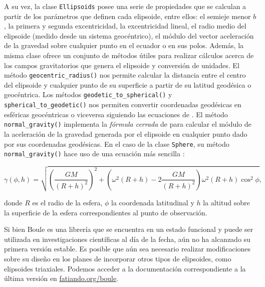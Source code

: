 

A su vez, la clase \texttt{Ellipsoids} posee una serie de propiedades que se
calculan a partir de los parámetros que definen cada elipsoide, entre ellos: el
semieje menor $b$, la primera y segunda excentricidad, la excentricidad lineal,
el radio medio del elipsoide (medido desde un sistema geocéntrico), el módulo
del vector aceleración de la gravedad sobre cualquier punto en el ecuador o en
sus polos.
Además, la misma clase ofrece un conjunto de métodos útiles para realizar
cálculos acerca de los campos gravitatorios que genera el elipsoide
y conversión de unidades.
El método \texttt{geocentric\_radius()} nos permite calcular la distancia entre
el centro del elipsoide y cualquier punto de su superficie a partir de su
latitud geodésica o geocéntrica.
Los métodos \texttt{geodetic\_to\_spherical()}
y \texttt{spherical\_to\_geodetic()} nos permiten convertir coordenadas
geodésicas en esféricas geocéntricas o viceversa siguiendo las ecuaciones de
\citet{vermeille2002}.
El método \texttt{normal\_gravity()} implementa la \emph{fórmula cerrada} de
\citet{li2001a} para calcular el módulo de la aceleración de la gravedad
generada por el elipsoide en cualquier punto dado por sus coordenadas
geodésicas.
En el caso de la clase \texttt{Sphere}, su método \texttt{normal\_gravity()}
hace uso de una ecuación más sencilla \citep{heiskanen1967}:

\begin{equation}
    \gamma(\phi, h) =
        \sqrt{\left( \frac{GM}{(R + h)^2} \right)^2
        + \left(\omega^2 (R + h) - 2\frac{GM}{(R + h)^2} \right)
        \omega^2 (R + h) \cos^2 \phi},
\end{equation}

\noindent donde $R$ es el radio de la esfera, $\phi$ la coordenada latitudinal
y $h$ la altitud sobre la superficie de la esfera correspondientes al punto de
observación.

Si bien Boule es una librería que se encuentra en un estado funcional
y puede ser utilizada en investigaciones científicas al día de la fecha, aún no
ha alcanzado su primera versión estable.
Es posible que aún sea necesario realizar modificaciones sobre su diseño en los
planes de incorporar otros tipos de elipsoides, como elipsoides
triaxiales.
Podemos acceder a la documentación correspondiente a la última versión en
\href{https://www.fatiando.org/boule}{fatiando.org/boule}.


